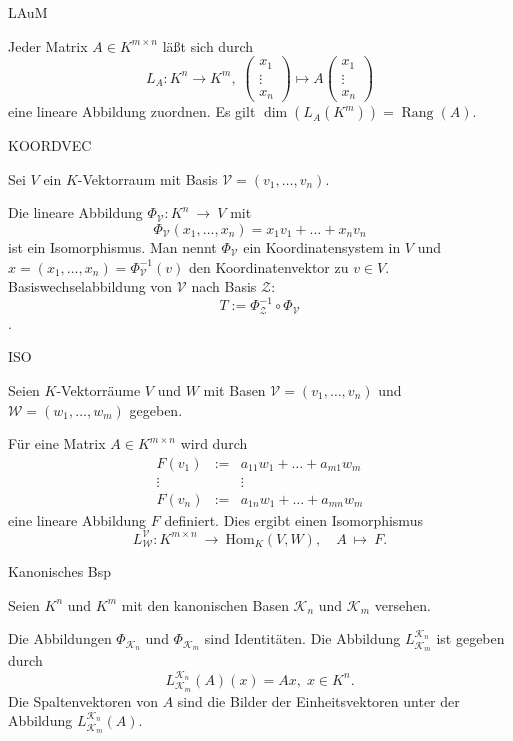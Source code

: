 \documentclass[fontsize=12pt,paper=a4,twoside,bibtotoc,idxtotoc,
liststotoc,pagesize,BCOR1.2cm,DIV15,chapterprefix,pagesize=pdftex]{scrbook}
\theoremstyle{plain}
\theoremstyle{definition}
\theoremstyle{remark}
\begin{document}
LAuM


 Jeder Matrix $A \in K^{m \times n}$ läßt sich durch 
\[
 L_A: K^n \rightarrow K^m,\; 
\begin{pmatrix}
 x_1\\
\vdots\\
x_n
\end{pmatrix}
\longmapsto
A
\begin{pmatrix}
 x_1\\
\vdots\\
x_n
\end{pmatrix}
\]
eine lineare Abbildung zuordnen.
 Es gilt $\operatorname{dim}(L_A(K^m))=\operatorname{Rang}(A)$.


KOORDVEC

Sei $V$ ein $K$-Vektorraum mit Basis $\mathcal{V}=(v_1, \dots
,v_n)$.

 Die lineare Abbildung 
$\Phi_\mathcal{V}:K^n \ \rightarrow \ V$ mit
\[\Phi_\mathcal{V}(x_1,\dots ,x_n)=x_1v_1+ \dots +x_nv_n\]
ist ein Isomorphismus. Man nennt $\Phi_\mathcal{V}$ ein
{\color{red} Koordinatensystem} in $V$ und $x=(x_1,\dots ,x_n)=\Phi_\mathcal{V}^{-1}(v)$
den {\color{red} Koordinatenvektor} zu $v \in V$.
 Basiswechselabbildung von $\mathcal{V}$ nach Basis $\mathcal{Z}$:
\[T:= \Phi_\mathcal{Z}^{-1} \circ \Phi_\mathcal{V}\].


ISO

Seien $K$-Vektorräume $V$ und $W$ mit Basen $\mathcal{V}=(v_1, \dots
,v_n)$ und $\mathcal{W}=(w_1, \dots ,w_m)$ gegeben. 

 Für eine Matrix $A\in K^{m
 \times n}$ wird durch
\begin{eqnarray*}
F(v_1) & := & a_{11}w_1 + \dots +a_{m1} w_m\\
\vdots &    & \vdots     \\
F(v_n) & := & a_{1n} w_1 + \dots + a_{mn}w_m
\end{eqnarray*}
eine lineare Abbildung $F$ definiert. Dies ergibt einen Isomorphismus
\[
L^\mathcal{V}_\mathcal{W}: K^{m \times n} \ \rightarrow \
\mathrm{Hom}_K(V,W), \quad A \ \mapsto \ F.
\] 

Kanonisches Bsp

Seien $K^n$ und $K^m$ mit den kanonischen Basen $\mathcal{K}_n$ und
$\mathcal{K}_m$ versehen.

 Die Abbildungen $\Phi_{\mathcal{K}_n}$ und $\Phi_{\mathcal{K}_m}$
sind Identitäten.
  Die Abbildung $L^{\mathcal{K}_n}_{\mathcal{K}_m}$ ist gegeben
durch 
\[ L^{\mathcal{K}_n}_{\mathcal{K}_m} (A)(x)=Ax,\; x \in K^n. \]
 Die Spaltenvektoren von $A$ sind die Bilder der Einheitsvektoren
unter der Abbildung  $L^{\mathcal{K}_n}_{\mathcal{K}_m}(A)$.
\end{document}
